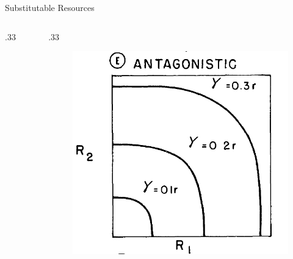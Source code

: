 \documentclass[final,xcolor=dvipsnames]{beamer}
\begin{document}
\begin{frame}{Substitutable Resources}
\begin{columns}
\begin{column}{.33\framewidth}
\begin{figure}
    \end{figure}
  \end{column}
    \begin{column}{.33\framewidth}
    \begin{figure}
       \includegraphics[width=.4\framewidth]{Antagonistic1}
    \end{figure}
  \end{column}
 \end{columns}
\end{frame}
\end{document}

